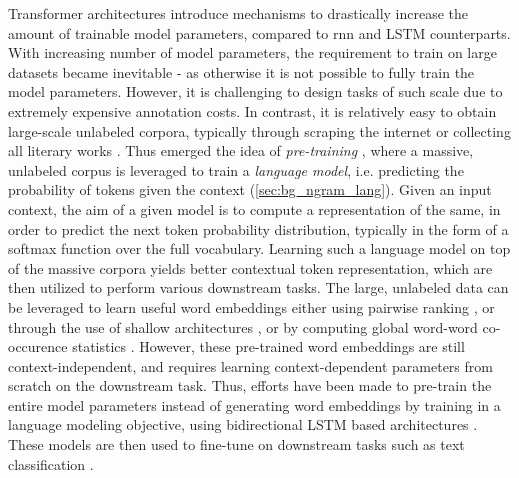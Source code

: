 \documentclass[letterpaper, 12pt]{report}
\begin{document}
Transformer architectures introduce mechanisms to drastically increase the amount of trainable model parameters, compared to \acrshort{rnn} and LSTM counterparts.
With increasing number of model parameters, the requirement to train on large datasets became inevitable - as otherwise it is not possible to fully train the model parameters. However, it is challenging to design tasks of such scale due to extremely expensive annotation costs. In contrast, it is relatively easy to obtain large-scale unlabeled corpora, typically through scraping the internet \cite{Raffel2020:T5} or collecting all literary works \cite{zhu2015aligning}. Thus emerged the idea of \textit{pre-training} \citep{mikolov2013efficient, peters-etal-2018-deep}, where a massive, unlabeled corpus is leveraged to train a \textit{language model}, i.e. predicting the probability of tokens given the context (\autoref{sec:bg_ngram_lang}). Given an input context, the aim of a given model is to compute a representation of the same, in order to predict the next token probability distribution, typically in the form of a softmax function over the full vocabulary. Learning such a language model on top of the massive corpora yields better contextual token representation, which are then utilized to perform various downstream tasks. The large, unlabeled data can be leveraged to learn useful word embeddings either using pairwise ranking \citep{collobert2008unified}, or through the use of shallow architectures \citep{mikolov2013efficient}, or by computing global word-word co-occurence statistics \citep{pennington2014glove}. However, these pre-trained word embeddings are still context-independent, and requires learning context-dependent parameters from scratch on the downstream task. Thus, efforts have been made to pre-train the entire model parameters instead of generating word embeddings by training in a language modeling objective, using bidirectional LSTM based architectures \citep{peters-etal-2018-deep}. These models are then used to fine-tune on downstream tasks such as text classification \citep{howard2018universal}.
\end{document}
